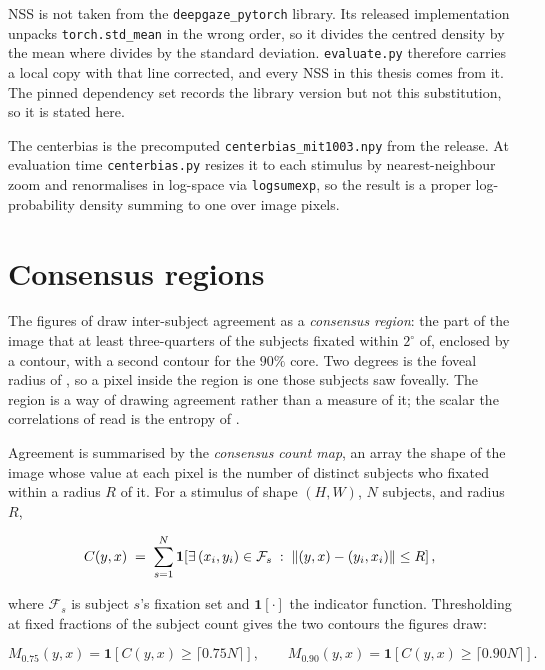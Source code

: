 NSS is not taken from the \texttt{deepgaze\_pytorch} library. Its released implementation
unpacks \texttt{torch.std\_mean} in the wrong order, so it divides the centred density by the mean where
 divides by the standard deviation. \texttt{evaluate.py} therefore carries a local copy with
that line corrected, and every NSS in this thesis comes from it. The pinned dependency set records the
library version but not this substitution, so it is stated here.

The centerbias is the precomputed \texttt{centerbias\_mit1003.npy} from the \dg{} release. At evaluation
time \texttt{centerbias.py} resizes it to each stimulus by nearest-neighbour zoom and renormalises in
log-space via \texttt{logsumexp}, so the result is a proper log-probability density summing to one over
image pixels.

\section{Consensus regions}
\label{app:consensus}

The figures of  draw inter-subject agreement as a \emph{consensus region}: the part of
the image that at least three-quarters of the subjects fixated within $2^\circ$ of, enclosed by a
contour, with a second contour for the $90\%$ core. Two degrees is the foveal radius of
, so a pixel inside the region is one those subjects saw foveally. The region is
a way of drawing agreement rather than a measure of it; the scalar the correlations of 
read is the entropy of .

Agreement is summarised by the \emph{consensus count map}, an array
the shape of the image whose value at each pixel is the number of distinct subjects who fixated within
a radius $R$ of it. For a stimulus of shape $(H, W)$, $N$ subjects, and radius $R$,

\begin{equation}
  C(y, x) \;=\; \sum_{s=1}^{N} \mathbf{1}\!\left[
    \exists\, (x_i, y_i) \in \mathcal{F}_s \;:\; \left\|(y, x) - (y_i, x_i)\right\| \leq R
  \right],
  \label{eq:consensus-count}
\end{equation}

where $\mathcal{F}_s$ is subject $s$'s fixation set and $\mathbf{1}[\cdot]$ the indicator function.
Thresholding at fixed fractions of the subject count gives the two contours the figures draw:

\begin{equation}
  M_{0.75}(y, x) = \mathbf{1}[C(y, x) \geq \lceil 0.75 N \rceil],
  \qquad
  M_{0.90}(y, x) = \mathbf{1}[C(y, x) \geq \lceil 0.90 N \rceil].
  \label{eq:consensus-masks}
\end{equation}

